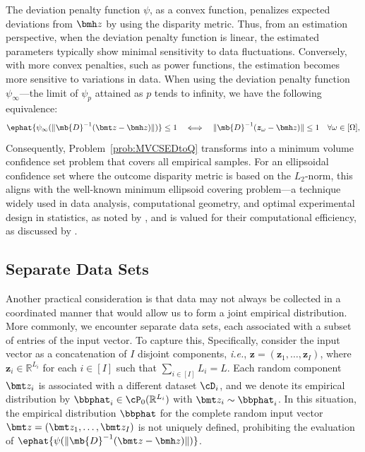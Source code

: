 \documentclass[opre, blindrev]{informs4}
\newcommand{\1}[1]{\mathds{1}{\left(#1\right)}}
\begin{document}
The deviation penalty function $\psi$, as a convex function, penalizes expected deviations from $\bmh z$ by using the disparity metric. Thus, from an estimation perspective, when the deviation penalty function is linear, the estimated parameters typically show minimal sensitivity to data fluctuations. Conversely, with more convex penalties, such as power functions, the estimation becomes more sensitive to variations in data. When using the deviation penalty function $\psi_\infty$---the limit of $\psi_p$ attained as $p$ tends to infinity, we have the following equivalence:
$$
\ephat{\psi_\infty(\|\mb{D}^{-1}( \bmt z - \bmh z )\|)} \leq 1
~~~\Longleftrightarrow~~~
\|\mb{D}^{-1}( \bm z_{\omega} - \bmh z )\| \leq 1 ~~~\forall \omega \in [\Omega], 
$$
Consequently, Problem~\eqref{prob:MVCSEDtoQ} transforms into a minimum volume confidence set problem that covers all empirical samples. For an ellipsoidal confidence set where the outcome disparity metric is based on the $L_2$-norm, this aligns with the well-known minimum ellipsoid covering problem---a technique widely used in data analysis, computational geometry, and optimal experimental design in statistics, as noted by \cite{todd2016minimum}, and is valued for their computational efficiency, as discussed by \cite{sun2004computation}.

\subsection*{Separate Data Sets}
Another practical consideration is that data may not always be collected in a coordinated manner that would allow us to form a joint empirical distribution. More commonly, we encounter separate data sets, each associated with a subset of entries of the input vector. To capture this, Specifically, consider the input vector as a concatenation of $I$ disjoint components, \textit{i.e.}, $\bm z = (\bm z_1, \dots, \bm z_I)$, where $\bm z_i \in \mathbb{R}^{L_i}$ for each $i \in [I]$ such that $\sum_{i \in [I]}L_i = L$. Each random component $\bmt z_i$ is associated with a different dataset $\cD_i$, and we denote its empirical distribution by $\bbphat_i \in \cP_0(\mathbb{R}^{L_i})$ with $\bmt z_i \sim \bbphat_i$. In this situation, the empirical distribution $\bbphat$ for the complete random input vector $\bmt z = (\bmt z_1, \dots, \bmt z_I)$ is not uniquely defined, prohibiting the evaluation of $\ephat{\psi(\|\mb{D}^{-1}(\bmt z - \bmh z)\|)}$.
\end{document}

